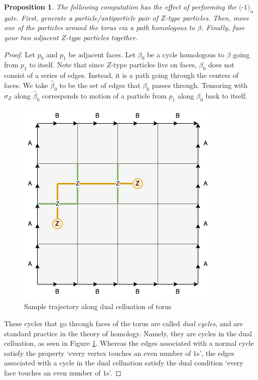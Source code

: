 \documentclass{article}
\newtheorem{proposition}{Proposition}[section]
\theoremstyle{definition}
\numberwithin{figure}{section}
\begin{document}
\begin{proposition}\label{Xparticle} The following computation has the effect of performing the $\text{(-1)}_{\alpha}$ gate. First, generate a particle/antiparticle pair of $Z$-type particles. Then, move one of the particles around the torus via a path homologous to $\beta$. Finally, fuse your two adjacent $Z$-type particles together.
\end{proposition}
\begin{proof} Let $p_0$ and $p_1$ be adjacent faces. Let $\beta_0$ be a cycle homologous to $\beta$ going from $p_1$ to itself. Note that since $Z$-type particles live on faces, $\beta_0$ does not consist of a series of edges. Instead, it is a path going through the centers of faces. We take $\widehat{\beta}_0$ to be the set of edges that $\beta_0$ passes through. Tensoring with $\sigma_Z$ along $\widehat{\beta}_0$ corresponds to motion of a particle from $p_1$ along $\beta_0$ back to itself.

\begin{figure}
\begin{center}
\includegraphics[scale=0.30]{dual-celluation}
\caption{Sample trajectory along dual celluation of torus}
\label{fig:dual-celluation}
\end{center}
\end{figure}

These cycles that go through faces of the torus are called \textit{dual cycles}, and are standard practice in the theory of homology. Namely, they are cycles in the dual celluation, as seen in Figure \ref{fig:dual-celluation}. Whereas the edges associated with a normal cycle satisfy the property `every vertex touches an even number of $1$s', the edges associated with a cycle in the dual celluation satisfy the dual condition `every face touches an even number of $1$s'.


\end{proof}
\end{document}
